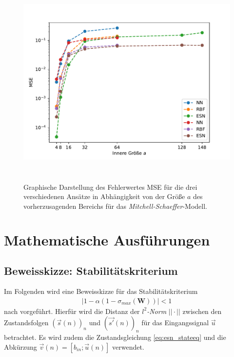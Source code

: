 \begin{appendices}
\begin{figure}[h]
	\centering
	\includegraphics[height=4.2in]{figures/results/inner_cross_prediction/mitchell_error_size_comparison.pdf}
	\caption{Graphische Darstellung des Fehlerwertes MSE für die drei verschiedenen Ansätze in Abhängigkeit von der Größe $a$ des vorherzusagenden Bereichs für das \textit{Mitchell-Schaeffer}-Modell.}
	\label{fig:apx_inner_prediction_error_size_comparison_ms}
\end{figure} 


\chapter{Mathematische Ausführungen}
\section{Beweisskizze: Stabilitätskriterium}
\label{sc:apx_math_stability_proof}
Im Folgenden wird eine Beweisskizze für das Stabilitätskriterium
\begin{align*}
|1-\alpha(1-\sigma_{max}(\mathbf{W}))| < 1
\end{align*}
nach \cite{jaeger2010} vorgeführt. Hierfür wird die Distanz der \textit{$l^2$-Norm} $||\cdot||$ zwischen den Zustandsfolgen $(\vec{s}(n))_n$ und $(\vec{s'}(n))_n$ für das Eingangssignal $\vec{u}$ betrachtet. Es wird zudem die Zustandsgleichung \ref{eq:esn_stateeq} und die Abkürzung $\vec{v}(n) = [b_{in}; \vec{u}(n)]$ verwendet. 


\end{appendices}
